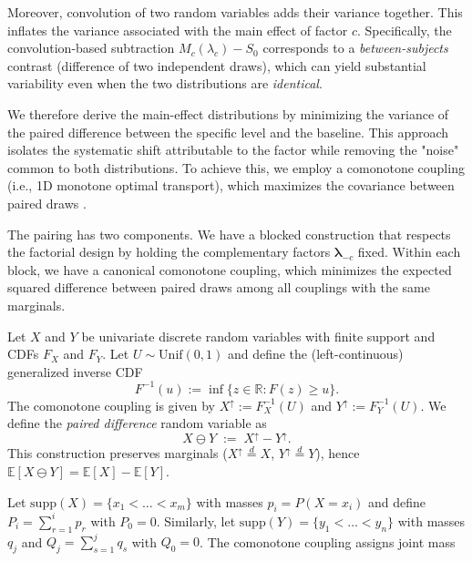 Moreover, convolution of two random variables adds their variance together.
This inflates the variance associated with the main effect of factor $c$.
Specifically, the
convolution-based subtraction
$M_c(\lambda_c)-S_0$ corresponds to a \emph{between-subjects} contrast (difference
of two independent draws), which can yield substantial variability even when
the two distributions are \emph{identical}.

We therefore derive the main-effect distributions by minimizing the variance of the paired difference between the specific level and the baseline. 
This approach isolates the systematic shift attributable to the factor while removing the "noise" common to both distributions.
To achieve this, we employ a comonotone coupling (i.e., 1D monotone optimal transport), which maximizes the covariance between paired draws \citep{villani2008optimal}. 

The pairing has two components. We have a blocked construction that respects
the factorial design by holding the complementary factors
$\boldsymbol{\lambda}_{-c}$ fixed.
Within each block, we have a canonical
comonotone coupling, which minimizes the expected squared difference between paired
draws among all couplings with the same marginals.

\begin{definition}
\label{def:paired-difference}
Let $X$ and $Y$ be univariate discrete random variables with finite support and
CDFs $F_X$ and $F_Y$. Let $U\sim\mathrm{Unif}(0,1)$ and define the (left-continuous)
generalized inverse CDF
\[
F^{-1}(u) := \inf\{z\in\mathbb{R}: F(z)\ge u\}.
\]
The comonotone coupling is given by
$X^\uparrow := F_X^{-1}(U)$ and $Y^\uparrow := F_Y^{-1}(U)$.
We define the \emph{paired difference} random variable as
\begin{equation}
\label{eq:paired-diff-rv}
X \ominus Y \;:=\; X^\uparrow - Y^\uparrow.
\end{equation}
This construction preserves marginals ($X^\uparrow\stackrel{d}{=}X$,
$Y^\uparrow\stackrel{d}{=}Y$), hence
$\mathbb{E}[X\ominus Y]=\mathbb{E}[X]-\mathbb{E}[Y]$.
\end{definition}

Let $\mathrm{supp}(X)=\{x_1<\dots<x_m\}$ with masses $p_i=P(X=x_i)$ and define
$P_i=\sum_{r=1}^i p_r$ with $P_0=0$. Similarly, let
$\mathrm{supp}(Y)=\{y_1<\dots<y_n\}$ with masses $q_j$ and
$Q_j=\sum_{s=1}^j q_s$ with $Q_0=0$.
The comonotone coupling assigns joint mass


